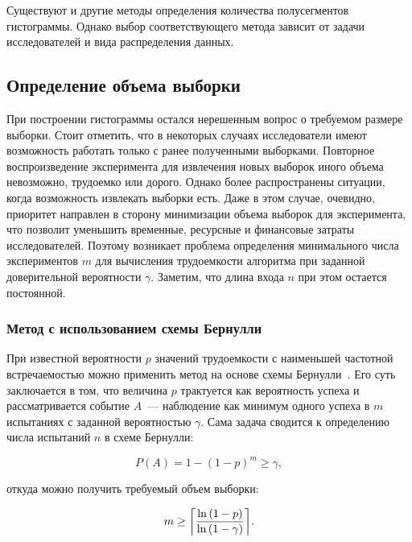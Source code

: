 \documentclass[a4paper, article, 14pt]{extarticle}
\begin{document}
Существуют и другие методы определения количества полусегментов гистограммы. Однако выбор соответствующего метода зависит от задачи исследователей и вида распределения данных.

\subsection{Определение объема выборки}\label{sec:selection_size}

При построении гистограммы остался нерешенным вопрос о требуемом размере выборки. Стоит отметить, что в некоторых случаях исследователи имеют возможность работать только с ранее полученными выборками. Повторное воспроизведение эксперимента для извлечения новых выборок иного объема невозможно, трудоемко или дорого. Однако более распространены ситуации, когда возможность извлекать выборки есть. Даже в этом случае, очевидно, приоритет направлен в сторону минимизации объема выборок для эксперимента, что позволит уменьшить временные, ресурсные и финансовые затраты исследователей. Поэтому возникает проблема определения минимального числа экспериментов $m$ для вычисления трудоемкости алгоритма при заданной доверительной вероятности $\gamma$. Заметим, что длина входа $n$ при этом остается постоянной.

\subsubsection{Метод с использованием схемы Бернулли}\label{sec:bernoulli_selection_size}

При известной вероятности $p$ значений трудоемкости с наименьшей частотной встречаемостью можно применить метод на основе схемы Бернулли~\cite{petrushyn_ulyanov_definitions}. Его суть заключается в том, что величина $p$ трактуется как вероятность успеха и рассматривается событие $A$~--- наблюдение как минимум одного успеха в $m$ испытаниях с заданной вероятностью $\gamma$. Сама задача сводится к определению числа испытаний $n$ в схеме Бернулли:

\begin{equation}\label{eq:bernoulli_selection}
	P(A) = 1 - (1 - p)^m \geq \gamma,
\end{equation}

\noindent откуда можно получить требуемый объем выборки:

\begin{equation}\label{eq:bernoulli_final_selection}
	m \geq \ceil*{\frac{\ln{(1 - p)}}{\ln{(1 - \gamma)}}}.
\end{equation}
\end{document}
